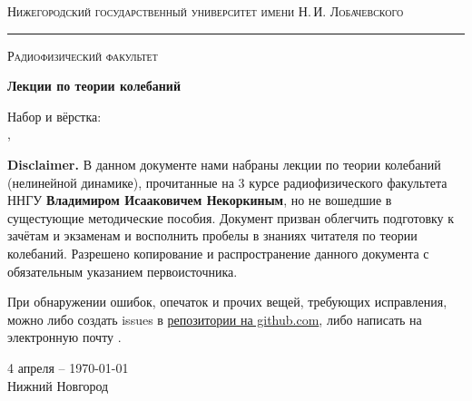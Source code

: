 \begin{titlepage}
\thispagestyle{empty}

\begin{center}
	{\small\textsc{Нижегородский государственный университет имени Н.\,И. Лобачевского}}
	\vskip 3pt \hrule \vskip 5pt
	{\small\textsc{Радиофизический факультет}}

	\vfill

	\begin{spacing}{2}
	{\Huge \bf  Лекции по теории колебаний}\\%
	\end{spacing}
	\vspace{1em}
	{ Набор и вёрстка:}\\[.5em]
	{ 
		\href{https://github.com/AnnaKarusevich}{\color{black}{Карусевич А.А.}},
		\href{https://github.com/fedorsarafanov}{\color{black}{Сарафанов Ф.Г.}}}\\[2em]
	\vspace{1em}
\end{center}

\textbf{Disclaimer.} В данном документе нами набраны лекции по теории колебаний (нелинейной динамике), прочитанные на 3 курсе радиофизического факультета ННГУ \textbf{Владимиром Исааковичем Некоркиным}, но не вошедшие в сущестующие методические пособия. Документ призван облегчить подготовку к зачётам и экзаменам и восполнить пробелы в знаниях читателя по теории колебаний. Разрешено копирование и распространение данного документа с обязательным указанием первоисточника. 

При обнаружении ошибок, опечаток и прочих вещей, требующих исправления, можно либо создать issues в \href{https://github.com/FedorSarafanov/NonlinearDynamics}{репозитории на github.com}, либо написать на электронную почту  \href{mailto:sfg180@yandex.ru}{\color{black}{sfg180@yandex.ru}}.

\begin{center}
	\vfill
	4 апреля -- \today\\Нижний Новгород
\end{center}

\end{titlepage}
